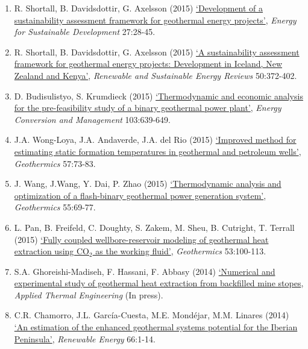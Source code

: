 \documentclass[12pts,a4paper]{report}%
\begin{document}
\begin{enumerate}[label=\bfseries Group \arabic*:]
%
\item R. Shortall, B. Davidsdottir, G. Axelsson (2015) \href{http://dx.doi.org/10.1016/j.esd.2015.02.004}{`Development of a sustainability assessment framework for geothermal energy projects'}, {\it Energy for Sustainable Development} 27:28-45.
%
\item R. Shortall, B. Davidsdottir, G. Axelsson (2015) \href{http://dx.doi.org/10.1016/j.rser.2015.04.175}{`A sustainability assessment framework for geothermal energy projects: Development in Iceland, New Zealand and Kenya'}, {\it Renewable and Sustainable Energy Reviews} 50:372-402.
%
\item D. Budisulistyo, S. Krumdieck (2015) \href{http://dx.doi.org/10.1016/j.enconman.2015.06.069}{`Thermodynamic and economic analysis for the pre-feasibility study of a binary geothermal power plant'}, {\it Energy Conversion and Management} 103:639-649.
%
\item J.A. Wong-Loya, J.A. Andaverde, J.A. del Rio (2015) \href{http://dx.doi.org/10.1016/j.geothermics.2015.06.002}{`Improved method for estimating static formation temperatures in geothermal and petroleum wells'}, {\it Geothermics} 57:73-83.
%
\item J. Wang, J.Wang, Y. Dai, P. Zhao (2015) \href{http://dx.doi.org/10.1016/j.geothermics.2015.01.012}{`Thermodynamic analysis and optimization of a flash-binary geothermal power generation system'}, {\it Geothermics} 55:69-77.
%
\item L. Pan, B. Freifeld, C. Doughty, S. Zakem, M. Sheu, B. Cutright, T. Terrall (2015) \href{http://dx.doi.org/10.1016/j.geothermics.2014.05.005}{`Fully coupled wellbore-reservoir modeling of geothermal heat extraction using CO$_{2}$ as the working fluid'}, {\it Geothermics} 53:100-113.
%
\item S.A. Ghoreishi-Madiseh, F. Hassani, F. Abbasy (2014) \href{http://dx.doi.org/10.1016/j.applthermaleng.2014.11.023}{`Numerical and experimental study of geothermal heat extraction from backfilled mine stopes}, {\it Applied Thermal Engineering} (In press).
%
\item C.R. Chamorro, J.L. García-Cuesta, M.E. Mondéjar, M.M. Linares (2014) \href{http://dx.doi.org/10.1016/j.renene.2013.11.065}{`An estimation of the enhanced geothermal systems potential for the Iberian Peninsula'}, {\it Renewable Energy} 66:1-14.
%


%
\end{enumerate}




%  
\end{document}
